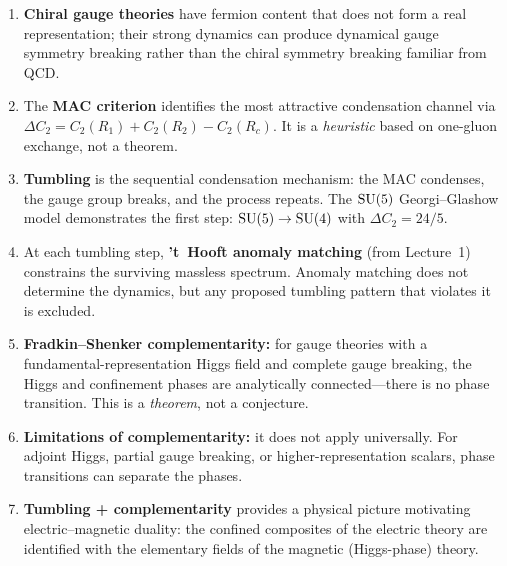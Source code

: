 \documentclass[11pt,a4paper]{article}
\begin{document}
\begin{tcolorbox}[
  enhanced,
  colback=green!5!white,
  colframe=green!60!black,
  fonttitle=\bfseries,
  title={Lecture 5: Summary}
]
\begin{enumerate}
  \item \textbf{Chiral gauge theories} have fermion content that does
    not form a real representation; their strong dynamics can produce
    dynamical gauge symmetry breaking rather than the chiral symmetry
    breaking familiar from QCD.

  \item The \textbf{MAC criterion} identifies the most attractive
    condensation channel via
    $\Delta C_2 = C_2(R_1) + C_2(R_2) - C_2(R_c)$.
    It is a \emph{heuristic} based on one-gluon exchange, not a
    theorem.

  \item \textbf{Tumbling} is the sequential condensation mechanism:
    the MAC condenses, the gauge group breaks, and the process repeats.
    The $\mathrm{SU}(5)$ Georgi--Glashow model demonstrates the first step:
    $\mathrm{SU}(5) \to \mathrm{SU}(4)$ with $\Delta C_2 = 24/5$.

  \item At each tumbling step, \textbf{'t~Hooft anomaly matching}
    (from Lecture~1) constrains the surviving massless spectrum.
    Anomaly matching does not determine the dynamics, but any
    proposed tumbling pattern that violates it is excluded.

  \item \textbf{Fradkin--Shenker complementarity:}  for gauge theories
    with a fundamental-representation Higgs field and complete gauge
    breaking, the Higgs and confinement phases are analytically
    connected---there is no phase transition.  This is a
    \emph{theorem}, not a conjecture.

  \item \textbf{Limitations of complementarity:}  it does not apply
    universally.  For adjoint Higgs, partial gauge breaking, or
    higher-representation scalars, phase transitions can separate
    the phases.

  \item \textbf{Tumbling + complementarity} provides a physical
    picture motivating electric--magnetic duality: the confined
    composites of the electric theory are identified with the
    elementary fields of the magnetic (Higgs-phase) theory.
\end{enumerate}
\end{tcolorbox}
\end{document}
